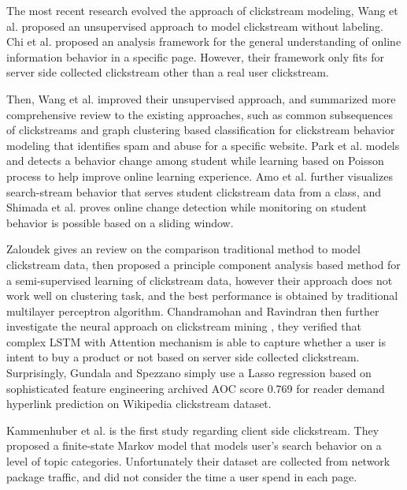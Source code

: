 The most recent research evolved the approach of clickstream modeling,
Wang et al.\cite{Wang:2016:UCC:2858036.2858107} proposed an unsupervised approach 
to model clickstream without labeling.
Chi et al. proposed an analysis framework \cite{chi2017towards} for the general understanding 
of online information behavior in a specific page. 
However, their framework only fits for server side collected clickstream other than 
a real user clickstream.

Then, Wang et al. \cite{Wang:2017:CUB:3127338.3068332} improved their unsupervised approach,
and summarized more comprehensive review to the existing approaches, 
such as common subsequences of clickstreams and graph clustering based classification 
for clickstream behavior modeling that identifies spam and abuse for a specific website. 
Park et al. models and detects a behavior change among student while learning 
based on Poisson process \cite{Park:2017:DCS:3027385.3027430} to
help improve online learning experience. Amo et al. \cite{amo2018learning} further visualizes search-stream
behavior that serves student clickstream data from a class, 
and Shimada et al. proves \cite{Shimada:2018:OCD:3170358.3170412}
online change detection while monitoring on student behavior is possible based on a sliding window.

Zaloudek gives an review on the comparison \cite{mastersthesis} traditional method to model clickstream data,
then proposed a principle component analysis based method for a semi-supervised learning
of clickstream data, however their approach does not work well on clustering task, and 
the best performance is obtained by traditional multilayer perceptron algorithm.
Chandramohan and Ravindran then further investigate the neural approach on clickstream mining \cite{N:2018:NAB:3152494.3152505},
they verified that complex LSTM with Attention mechanism is able to capture whether a user
is intent to buy a product or not based on server side collected clickstream.
Surprisingly, Gundala and Spezzano \cite{Gundala:2018:RDH:3184558.3191644} simply use a Lasso
regression based on sophisticated feature engineering 
archived AOC score 0.769 for reader demand hyperlink prediction on Wikipedia clickstream dataset.

Kammenhuber et al. is the first study \cite{Kammenhuber:2006:WSC:1177080.1177110} 
regarding client side clickstream. 
They proposed a finite-state Markov model that models user's search behavior on a level of
topic categories. Unfortunately their dataset are collected from network package traffic,
and did not consider the time a user spend in each page.


